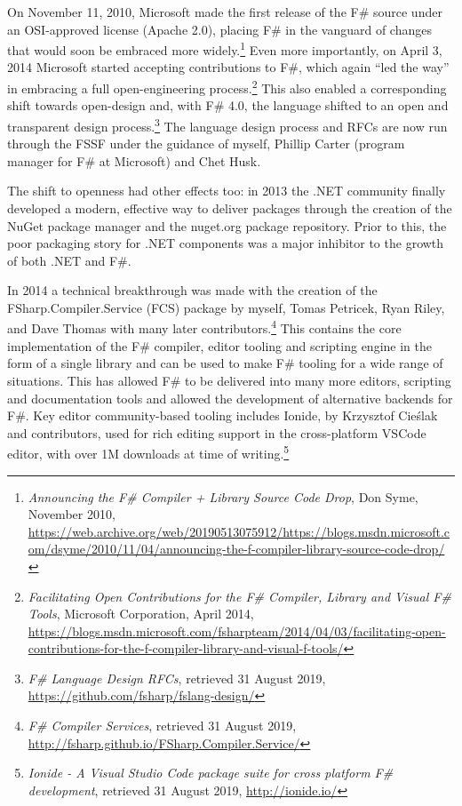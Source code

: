 \documentclass[acmsmall]{acmart}\settopmatter{}
\begin{document}
On November 11, 2010, Microsoft made the first release of the F\# source under an OSI-approved
license (Apache 2.0), placing F\# in the vanguard of changes that would soon be embraced more widely.\footnote{\textit{Announcing the F\# Compiler + Library Source Code Drop}, Don Syme, November 2010, \url{https://web.archive.org/web/20190513075912/https://blogs.msdn.microsoft.com/dsyme/2010/11/04/announcing-the-f-compiler-library-source-code-drop/}}
Even more importantly, on April 3, 2014 Microsoft started accepting contributions to F\#, which again “led the way” in embracing
a full open-engineering process.\footnote{\textit{Facilitating Open Contributions for the F\# Compiler, Library and Visual F\# Tools}, Microsoft Corporation, April 2014, \url{https://blogs.msdn.microsoft.com/fsharpteam/2014/04/03/facilitating-open-contributions-for-the-f-compiler-library-and-visual-f-tools/}}
This also enabled a corresponding shift towards open-design and, with F\# 4.0, the
language shifted to an open and transparent design process.\footnote{\textit{F\# Language Design RFCs}, retrieved 31 August 2019, \url{https://github.com/fsharp/fslang-design/}}
The language design process and RFCs are now run through the FSSF under the guidance of myself, Phillip Carter (program manager for F\# at Microsoft) and Chet Husk.

The shift to openness had other effects too: in 2013 the .NET community finally developed a modern, effective way to
deliver packages through the creation of the NuGet package manager and the nuget.org package repository.  Prior to
this, the poor packaging story for .NET components was a major inhibitor to the growth of both .NET and F\#.  

In 2014 a technical breakthrough was made with the creation of the FSharp.Compiler.Service (FCS) package by
myself, Tomas Petricek, Ryan Riley, and Dave Thomas with many later contributors.\footnote{\textit{F\# Compiler Services}, retrieved 31
August 2019, \url{http://fsharp.github.io/FSharp.Compiler.Service/}}
This contains the core implementation of the F\# compiler, editor tooling and scripting engine in the form of a single library and can be used to make F\# tooling
for a wide range of situations.  This has allowed F\# to be delivered into many more editors, scripting and documentation
tools and allowed the development of alternative backends for F\#.   Key editor community-based tooling includes
Ionide, by Krzysztof Cieślak and contributors, used for rich editing support in the cross-platform VSCode editor, with over 1M downloads at time
of writing.\footnote{\textit{Ionide - A Visual Studio Code package suite for cross platform F\# development}, retrieved 31 August 2019, \url{http://ionide.io/}}
\end{document}
